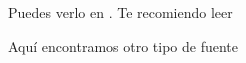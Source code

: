\documentclass[a4paper,openright,12pt]{report}
\begin{document}
	
	Puedes verlo en \cite{Patricio2011}. Te recomiendo leer \cite{Patricio2011 ,Zacarias2009, latexcompanion}
	
	Aquí encontramos otro tipo de fuente \cite{knuthwebsite}
	
	
	
\end{document}
